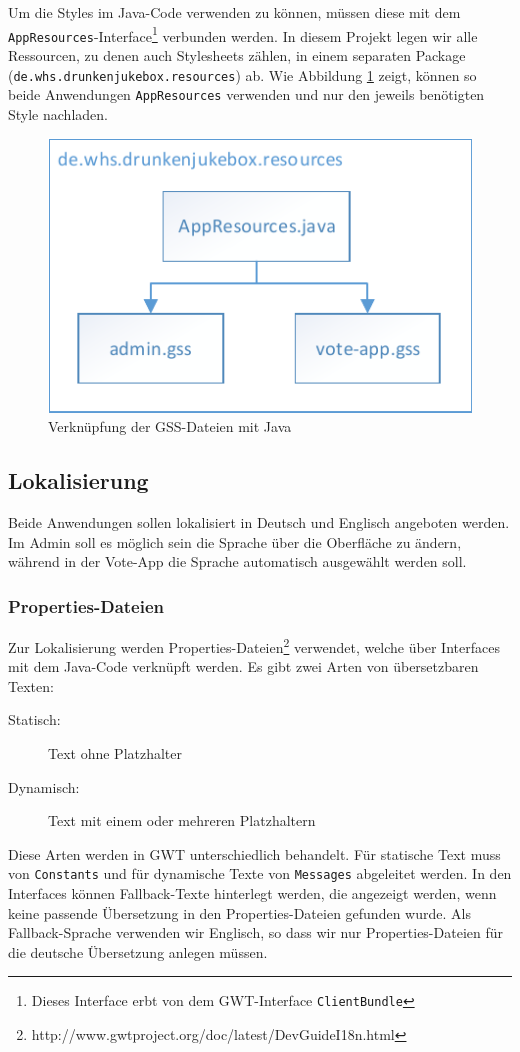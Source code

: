 Um die Styles im Java-Code verwenden zu können, müssen diese mit dem \texttt{AppResources}-Interface\footnote{Dieses Interface erbt von dem GWT-Interface \texttt{ClientBundle}} verbunden werden.
In diesem Projekt legen wir alle Ressourcen, zu denen auch Stylesheets zählen, in
einem separaten Package (\texttt{de.whs.drunkenjukebox.resources}) ab. Wie Abbildung
\ref{fig:GSS} zeigt, können so beide Anwendungen \texttt{AppResources} verwenden
und nur den jeweils benötigten Style nachladen.

\begin{figure}[tbh]
\centering
\includegraphics[width=0.6\linewidth]{Bilder/GSS}
\caption{Verknüpfung der GSS-Dateien mit Java}
\label{fig:GSS}
\end{figure}


\subsection{Lokalisierung}
Beide Anwendungen sollen lokalisiert in Deutsch und Englisch angeboten werden.
Im Admin soll es möglich sein die Sprache über die Oberfläche zu ändern, während
in der Vote-App die Sprache automatisch ausgewählt werden soll.

\subsubsection{Properties-Dateien}

Zur Lokalisierung werden Properties-Dateien\footnote{http://www.gwtproject.org/doc/latest/DevGuideI18n.html} verwendet, welche über Interfaces
mit dem Java-Code verknüpft werden. Es gibt zwei Arten von übersetzbaren Texten:
\begin{description}
	\item[Statisch:] Text ohne Platzhalter
	\item[Dynamisch:] Text mit einem oder mehreren Platzhaltern
\end{description}
Diese Arten werden in GWT unterschiedlich behandelt. Für statische Text muss
von \texttt{Constants} und für dynamische Texte von \texttt{Messages} abgeleitet werden. In den Interfaces können Fallback-Texte hinterlegt werden, die angezeigt werden, wenn keine passende Übersetzung in den Properties-Dateien gefunden wurde. Als
Fallback-Sprache verwenden wir Englisch, so dass wir nur Properties-Dateien für
die deutsche Übersetzung anlegen müssen.

